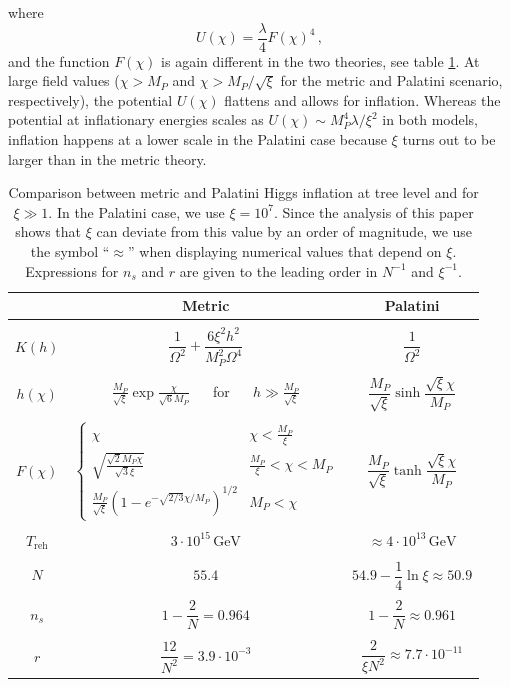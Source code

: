 \documentclass[a4paper,11pt]{article}
\renewcommand{\O}{\Omega}
\begin{document}
where
\begin{equation}\label{Potential}
U(\chi)=\dfrac{\lambda}{4}F(\chi)^4 \,,
\end{equation}
and the function $F(\chi)$ is again different in the two theories, see table \ref{table}. At large field values ($\chi>M_P$ and $\chi > M_P/\sqrt{\xi}$ for the metric and Palatini scenario, respectively), the potential $U(\chi)$ flattens and allows for inflation. Whereas the potential at inflationary energies scales as $U(\chi)\sim M_P^4\lambda/\xi^2$ in both models, inflation happens at a lower scale in the Palatini case because $\xi$ turns out to be larger than in the metric theory.

	\begin{table}
	\begin{tabular}{c|c@{\hskip 0.1\linewidth}c}
		& Metric 							 & Palatini 		\\
		\hline \\
		$K(h)$		 & $\dfrac{1}{\O^2}+\dfrac{6\xi^2h^2}{M_P^2\O^4}$ & 	$\dfrac{1}{\O^2}$ 		\\
		\\
		$h(\chi)$ & $\frac{M_P}{\sqrt{\xi}} \exp \frac{\chi}{\sqrt{6}M_P}$ ~~ for ~~  $h\gg \frac{M_P}{\sqrt{\xi}}$ & $\dfrac{M_P}{\sqrt{\xi}}\sinh\dfrac{\sqrt{\xi}\chi}{M_P}$\\  \\
		$F(\chi)$	 & $\begin{cases}
		\chi & \chi<\frac{M_P}{\xi}\\
		\sqrt{\frac{\sqrt{2}M_P \chi}{\sqrt{3}\xi}}& \frac{M_P}{\xi}<\chi <M_P\\
		\frac{M_P}{\sqrt{\xi}}\left(1-e^{-\sqrt{2/3}\chi/M_P}\right)^{1/2} & M_P< \chi  \end{cases}$ & $\dfrac{M_P}{\sqrt{\xi}}\tanh\dfrac{\sqrt{\xi}\chi}{M_P}$ \\ \\
			$T_{\text{reh}} $		 &  $ 3 \cdot 10^{15} \, \text{GeV}$				 & $\approx 4 \cdot 10^{13} \, \text{GeV}$\\ \\
			$N$	 & $55.4$ & $54.9-\dfrac{1}{4}\ln\xi \approx 50.9$\\ \\
		$n_s$		 & $1-\dfrac{2}{N} = 0.964$ 				 & $1-\dfrac{2}{N} \approx 0.961$ \\ \\
		$r$		 & $\dfrac{12}{N^2} = 3.9\cdot 10^{-3}$			 & $\dfrac{2}{\xi N^2}\approx 7.7\cdot 10^{-11}$ 
	\end{tabular}
	\caption{Comparison between metric and Palatini Higgs inflation at tree level and for $\xi\gg 1$. In the Palatini case, we use $\xi = 10^7$. Since the analysis of this paper shows that $\xi$ can deviate from this value by an order of magnitude, we use the symbol ``$\approx$'' when displaying numerical values that depend on $\xi$. Expressions for $n_s$ and $r$ are given to the leading order in $N^{-1}$ and $\xi^{-1}$. }
	\label{table}
\end{table}
\end{document}
